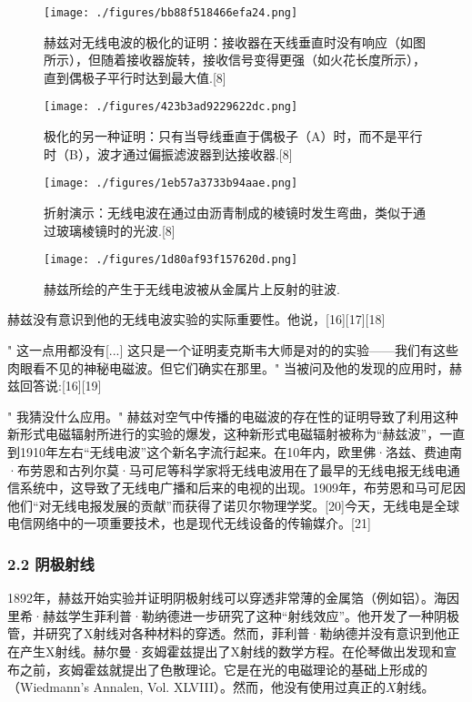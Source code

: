 \begin{figure}[ht]
\centering
\texttt{[image: ./figures/bb88f518466efa24.png]}
\caption{赫兹对无线电波的极化的证明：接收器在天线垂直时没有响应（如图所示），但随着接收器旋转，接收信号变得更强（如火花长度所示），直到偶极子平行时达到最大值.[8]} \label{fig_Hertz_5}
\end{figure}
\begin{figure}[ht]
\centering
\texttt{[image: ./figures/423b3ad9229622dc.png]}
\caption{极化的另一种证明：只有当导线垂直于偶极子（A）时，而不是平行时（B），波才通过偏振滤波器到达接收器.[8]} \label{fig_Hertz_6}
\end{figure}
\begin{figure}[ht]
\centering
\texttt{[image: ./figures/1eb57a3733b94aae.png]}
\caption{折射演示：无线电波在通过由沥青制成的棱镜时发生弯曲，类似于通过玻璃棱镜时的光波.[8]} \label{fig_Hertz_7}
\end{figure}
\begin{figure}[ht]
\centering
\texttt{[image: ./figures/1d80af93f157620d.png]}
\caption{赫兹所绘的产生于无线电波被从金属片上反射的驻波.} \label{fig_Hertz_8}
\end{figure}
赫兹没有意识到他的无线电波实验的实际重要性。他说，[16][17][18]

" 这一点用都没有[...] 这只是一个证明麦克斯韦大师是对的的实验——我们有这些肉眼看不见的神秘电磁波。但它们确实在那里。"
当被问及他的发现的应用时，赫兹回答说:[16][19]

" 我猜没什么应用。"
赫兹对空气中传播的电磁波的存在性的证明导致了利用这种新形式电磁辐射所进行的实验的爆发，这种新形式电磁辐射被称为“赫兹波”，一直到1910年左右“无线电波”这个新名字流行起来。在10年内，欧里佛·洛兹、费迪南·布劳恩和古列尔莫·马可尼等科学家将无线电波用在了最早的无线电报无线电通信系统中，这导致了无线电广播和后来的电视的出现。1909年，布劳恩和马可尼因他们“对无线电报发展的贡献”而获得了诺贝尔物理学奖。[20]今天，无线电是全球电信网络中的一项重要技术，也是现代无线设备的传输媒介。[21]

\subsubsection{2.2 阴极射线}
1892年，赫兹开始实验并证明阴极射线可以穿透非常薄的金属箔（例如铝）。海因里希·赫兹学生菲利普·勒纳德进一步研究了这种“射线效应”。他开发了一种阴极管，并研究了X射线对各种材料的穿透。然而，菲利普·勒纳德并没有意识到他正在产生X射线。赫尔曼·亥姆霍兹提出了X射线的数学方程。在伦琴做出发现和宣布之前，亥姆霍兹就提出了色散理论。它是在光的电磁理论的基础上形成的（Wiedmann's Annalen, Vol. XLVIII）。然而，他没有使用过真正的$X$射线。

